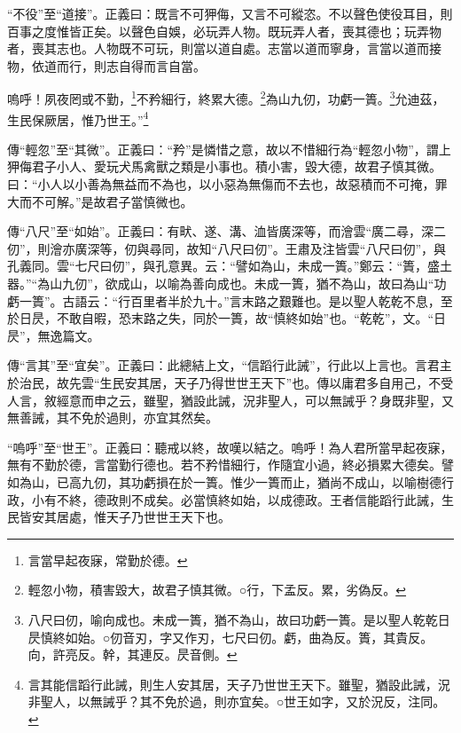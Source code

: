 {\noindent\shu{}\fzkt “不役”至“道接”。正義曰：既言不可狎侮，又言不可縱恣。不以聲色使役耳目，則百事之度惟皆正矣。以聲色自娛，必玩弄人物。既玩弄人者，喪其德也；玩弄物者，喪其志也。人物既不可玩，則當以道自處。志當以道而寧身，言當以道而接物，依道而行，則志自得而言自當。 \par}

嗚呼！夙夜罔或不勤，\footnote{言當早起夜寐，常勤於德。}不矜細行，終累大德。\footnote{輕忽小物，積害毀大，故君子慎其微。○行，下孟反。累，劣偽反。}為山九仞，功虧一簣。\footnote{八尺曰仞，喻向成也。未成一簣，猶不為山，故曰功虧一簣。是以聖人乾乾日昃慎終如始。○仞音刃，字又作刃，七尺曰仞。虧，曲為反。簣，其貴反。向，許亮反。幹，其連反。昃音側。}允迪茲，生民保厥居，惟乃世王。”\footnote{言其能信蹈行此誡，則生人安其居，天子乃世世王天下。雖聖，猶設此誡，況非聖人，以無誡乎？其不免於過，則亦宜矣。○世王如字，又於況反，注同。}


{\noindent\zhuan{}\fzbyks 傳“輕忽”至“其微”。正義曰：“矜”是憐惜之意，故以不惜細行為“輕忽小物”，謂上狎侮君子小人、愛玩犬馬禽獸之類是小事也。積小害，毀大德，故君子慎其微。曰：“小人以小善為無益而不為也，以小惡為無傷而不去也，故惡積而不可掩，罪大而不可解。”是故君子當慎微也。 \par}

{\noindent\zhuan{}\fzbyks 傳“八尺”至“如始”。正義曰：有畎、遂、溝、洫皆廣深等，而澮雲“廣二尋，深二仞”，則澮亦廣深等，仞與尋同，故知“八尺曰仞”。王肅及注皆雲“八尺曰仞”，與孔義同。雲“七尺曰仞”，與孔意異。云：“譬如為山，未成一簣。”鄭云：“簣，盛土器。”“為山九仞”，欲成山，以喻為善向成也。未成一簣，猶不為山，故曰為山“功虧一簣”。古語云：“行百里者半於九十。”言末路之艱難也。是以聖人乾乾不息，至於日昃，不敢自暇，恐末路之失，同於一簣，故“慎終如始”也。“乾乾”，文。“日昃”，無逸篇文。 \par}

{\noindent\zhuan{}\fzbyks 傳“言其”至“宜矣”。正義曰：此總結上文，“信蹈行此誡”，行此以上言也。言君主於治民，故先雲“生民安其居，天子乃得世世王天下”也。傳以庸君多自用己，不受人言，敘經意而申之云，雖聖，猶設此誡，況非聖人，可以無誡乎？身既非聖，又無善誡，其不免於過則，亦宜其然矣。 \par}

{\noindent\shu{}\fzkt “嗚呼”至“世王”。正義曰：聽戒以終，故嘆以結之。嗚呼！為人君所當早起夜寐，無有不勤於德，言當勤行德也。若不矜惜細行，作隨宜小過，終必損累大德矣。譬如為山，已高九仞，其功虧損在於一簣。惟少一簣而止，猶尚不成山，以喻樹德行政，小有不終，德政則不成矣。必當慎終如始，以成德政。王者信能蹈行此誡，生民皆安其居處，惟天子乃世世王天下也。 \par}

